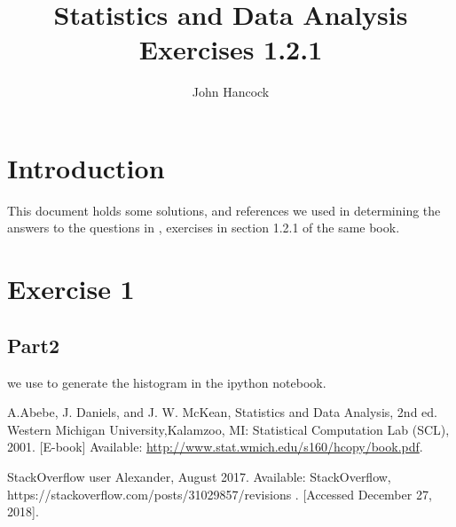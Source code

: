 \documentclass[12pt, tikz, letterpaper]{article}
\title{Statistics and Data Analysis Exercises 1.2.1}
\author{John Hancock}
\begin{document}
\maketitle
\section*{Introduction}

This document holds some solutions, and references we used in determining the answers to the questions in
\cite{statsAndData}, exercises in section 1.2.1 of the same book.

\section{Exercise 1}
\subsection{Part2} we use \cite{stackHistogram} to generate the histogram in the ipython notebook.

\begin{thebibliography}{99}


 A.Abebe, J. Daniels, and J. W. McKean, Statistics and Data Analysis,
  2nd ed. Western Michigan University,Kalamzoo, MI: Statistical Computation Lab (SCL), 2001. [E-book] Available:
  \url{http://www.stat.wmich.edu/s160/hcopy/book.pdf}.

 StackOverflow user Alexander, August 2017. Available: StackOverflow, https://stackoverflow.com/posts/31029857/revisions . [Accessed December 27, 2018].
\end{thebibliography}
\end{document}
